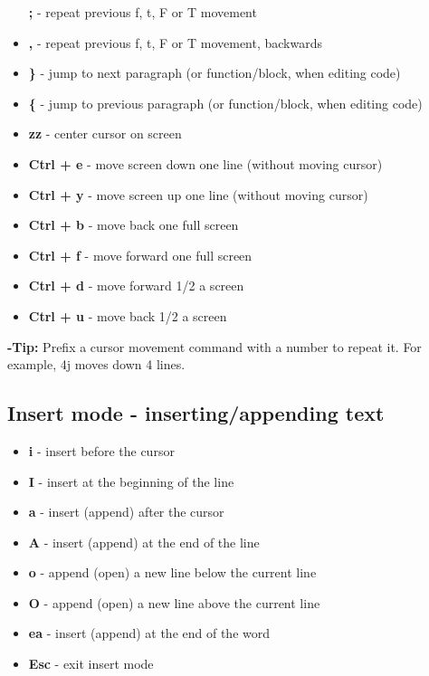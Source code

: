 \documentclass[landscape,twocolumn]{article}
\providecommand{\tightlist}{%
  \setlength{\itemsep}{0pt}\setlength{\parskip}{0pt}}
\begin{document}
\begin{itemize}
  \textbf{;} - repeat previous f, t, F or T movement
\item
  \textbf{,} - repeat previous f, t, F or T movement, backwards
\item
  \textbf{\}} - jump to next paragraph (or function/block, when editing
  code)
\item
  \textbf{\{} - jump to previous paragraph (or function/block, when
  editing code)
\item
  \textbf{zz} - center cursor on screen
\item
  \textbf{Ctrl + e} - move screen down one line (without moving cursor)
\item
  \textbf{Ctrl + y} - move screen up one line (without moving cursor)
\item
  \textbf{Ctrl + b} - move back one full screen
\item
  \textbf{Ctrl + f} - move forward one full screen
\item
  \textbf{Ctrl + d} - move forward 1/2 a screen
\item
  \textbf{Ctrl + u} - move back 1/2 a screen
\end{itemize}

\textbf{-Tip:} Prefix a cursor movement command with a number to repeat
it. For example, 4j moves down 4 lines.

\hypertarget{insert-mode---insertingappending-text}{%
\subsection{Insert mode - inserting/appending
text}\label{insert-mode---insertingappending-text}}

\begin{itemize}
\tightlist
\item
  \textbf{i} - insert before the cursor
\item
  \textbf{I} - insert at the beginning of the line
\item
  \textbf{a} - insert (append) after the cursor
\item
  \textbf{A} - insert (append) at the end of the line
\item
  \textbf{o} - append (open) a new line below the current line
\item
  \textbf{O} - append (open) a new line above the current line
\item
  \textbf{ea} - insert (append) at the end of the word
\item
  \textbf{Esc} - exit insert mode
\end{itemize}
\end{document}
